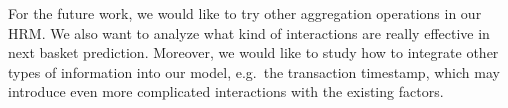 \documentclass[10pt,journal,compsoc]{IEEEtran}
\begin{document}
For the future work, we would like to try other aggregation operations in our HRM. We also want to analyze what kind of interactions are really effective in next basket prediction. Moreover, we would like to study how to integrate other types of information into our model, e.g.~the transaction timestamp, which may introduce even more complicated interactions with the existing factors.


%
%



%
%
\end{document}
